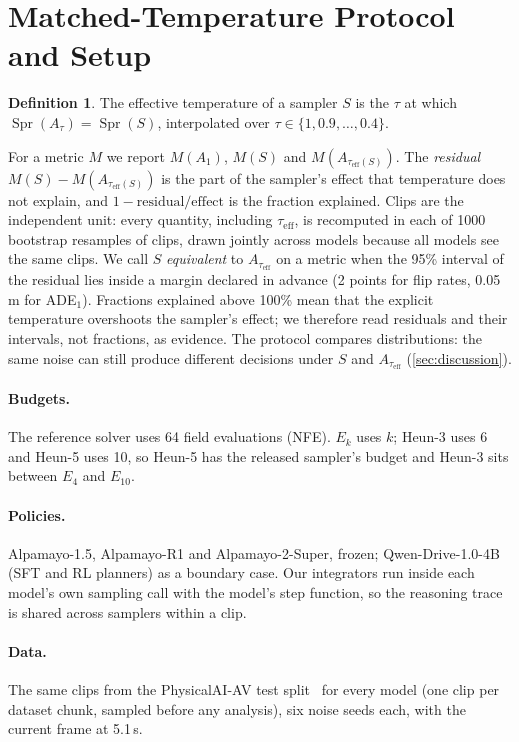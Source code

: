\documentclass{article}
\theoremstyle{plain}
\theoremstyle{definition}
\newtheorem{definition}[theorem]{Definition}
\theoremstyle{remark}
\newcommand{\taueff}{\tau_{\mathrm{eff}}}
\newcommand{\Aref}{A_{1}}
\newcommand{\Atau}{A_{\tau}}
\newcommand{\At}[1]{A_{#1}}
\newcommand{\Spr}{\operatorname{Spr}}
\begin{document}
\section{Matched-Temperature Protocol and Setup}
\label{sec:protocol}
\begin{definition}
The effective temperature of a sampler $S$ is the $\tau$ at which $\Spr(\Atau)=\Spr(S)$, interpolated over $\tau\in\{1,0.9,\dots,0.4\}$.
\end{definition}
For a metric $M$ we report $M(\Aref)$, $M(S)$ and $M(A_{\taueff(S)})$. The \emph{residual} $M(S)-M(A_{\taueff(S)})$ is the part of the sampler's effect that temperature does not explain, and $1-\text{residual}/\text{effect}$ is the fraction explained. Clips are the independent unit: every quantity, including $\taueff$, is recomputed in each of 1000 bootstrap resamples of clips, drawn jointly across models because all models see the same clips. We call $S$ \emph{equivalent} to $\At{\taueff}$ on a metric when the 95\% interval of the residual lies inside a margin declared in advance (2 points for flip rates, 0.05\,m for ADE$_1$). Fractions explained above 100\% mean that the explicit temperature overshoots the sampler's effect; we therefore read residuals and their intervals, not fractions, as evidence. The protocol compares distributions: the same noise can still produce different decisions under $S$ and $\At{\taueff}$ (\cref{sec:discussion}).

\paragraph{Budgets.} The reference solver uses 64 field evaluations (NFE). $E_k$ uses $k$; Heun-3 uses 6 and Heun-5 uses 10, so Heun-5 has the released sampler's budget and Heun-3 sits between $E_4$ and $E_{10}$.

\paragraph{Policies.} Alpamayo-1.5, Alpamayo-R1 and Alpamayo-2-Super, frozen; Qwen-Drive-1.0-4B (SFT and RL planners) as a boundary case. Our integrators run inside each model's own sampling call with the model's step function, so the reasoning trace is shared across samplers within a clip.
\paragraph{Data.} The same \NClips{} clips from the PhysicalAI-AV test split~\citep{physicalai2026} for every model (one clip per dataset chunk, sampled before any analysis), six noise seeds each, with the current frame at 5.1\,s.
\end{document}
